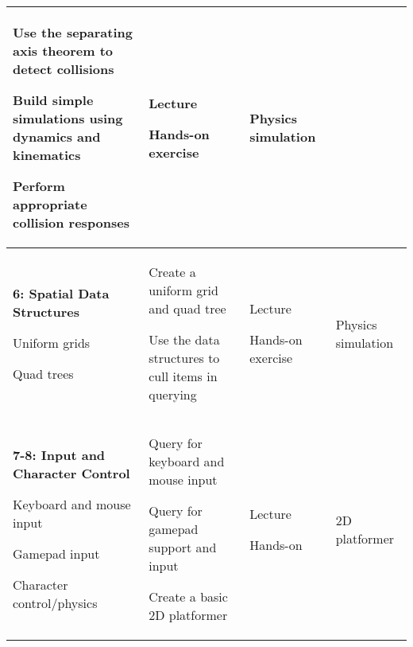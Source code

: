 \documentclass[10pt]{article}
\newenvironment{itemize*}{
\begin{itemize}[leftmargin=1em,noitemsep,nolistsep]
}{\end{itemize}}
\begin{document}
\begin{longtable}{||p{1.8in}|p{2.4in}|p{1.3in}|p{1in}||}
	\begin{itemize*}
		\item Use the separating axis theorem to detect collisions
		\item Build simple simulations using dynamics and kinematics
		\item Perform appropriate collision responses
	\end{itemize*} &
	\begin{itemize*}
		\item Lecture
		\item Hands-on exercise
	\end{itemize*} & Physics simulation \\ \hline
\textbf{6: Spatial Data Structures} 
	\begin{itemize*}
		\item Uniform grids
		\item Quad trees
	\end{itemize*} &
	\begin{itemize*}
		\item Create a uniform grid and quad tree
		\item Use the data structures to cull items in querying
	\end{itemize*} &
	\begin{itemize*}
		\item Lecture
		\item Hands-on exercise
	\end{itemize*} & Physics simulation \\ \hline
\textbf{7-8: Input and Character Control} 
	\begin{itemize*}
		\item Keyboard and mouse input
		\item Gamepad input
		\item Character control/physics
	\end{itemize*} &
	\begin{itemize*}
		\item Query for keyboard and mouse input
		\item Query for gamepad support and input
		\item Create a basic 2D platformer
	\end{itemize*} & 
	\begin{itemize*}
		\item Lecture
		\item Hands-on
	\end{itemize*} & 2D platformer \\ \hline

\end{longtable}
\end{document}
